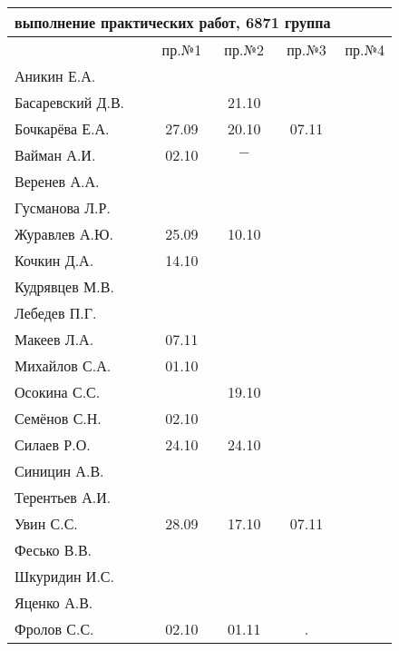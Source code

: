 \documentclass[a4paper,landscape,11pt]{article}
\begin{document}
\begin{tabular}{l|cccc}
\multicolumn{4}{c}{выполнение практических работ, 6871 группа} \\
\toprule
& пр.№1 & пр.№2  &  пр.№3 &  пр.№4\\
\midrule
Аникин Е.А.     &     &     &     &\\    
Басаревский Д.В.&     &21.10&     &\\
Бочкарёва Е.А.  &27.09&20.10&07.11&\\
Вайман А.И.     &02.10&$-$  &     &\\
Веренев А.А.    &     &     &     &\\
Гусманова Л.Р.  &     &     &     &\\
Журавлев А.Ю.   &25.09&10.10&     &\\
Кочкин Д.А.     &14.10&     &     &\\
Кудрявцев М.В.  &     &     &     &\\
Лебедев П.Г.    &     &     &     &\\
Макеев Л.А.     &07.11&     &     &\\
Михайлов С.А.   &01.10&     &     &\\
Осокина С.С.    &     &19.10&     &\\
Семёнов С.Н.    &02.10&     &     &\\
Силаев Р.О.     &24.10&24.10&     &\\
Синицин А.В.    &     &     &     &\\
Терентьев А.И.  &     &     &     &\\
Увин С.С.       &28.09&17.10&07.11&\\
Фесько В.В.     &     &     &     &\\
Шкуридин И.С.   &     &     &     &\\
Яценко А.В.     &     &     &     &\\
Фролов С.С.     &02.10&01.11& .   &\\
\bottomrule
\end{tabular}
\end{document}
